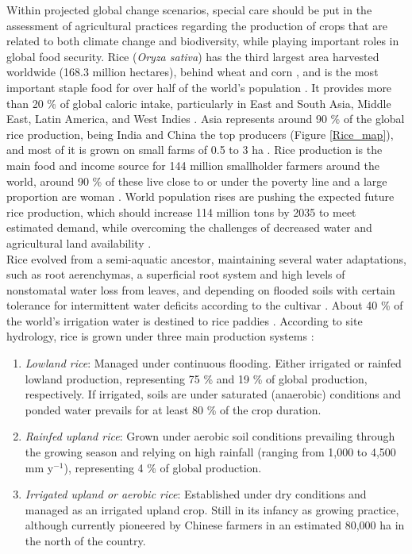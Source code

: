 Within projected global change scenarios, special care should be put in the assessment of agricultural practices regarding the production of crops that are related to both climate change and biodiversity, while playing important roles in global food security. Rice (\textit{Oryza sativa}) has the third largest area harvested worldwide (168.3 million hectares), behind wheat and corn \citep{fao2023a}, and is the most important staple food for over half of the world's population \citep{seck2012crops}. It provides more than 20 \% of global caloric intake, particularly in East and South Asia, Middle East, Latin America, and West Indies \citep{sharif2014rice}. Asia represents around 90 \% of the global rice production, being India and China the top producers (Figure \ref{Rice_map}), and most of it is grown on small farms of 0.5 to 3 ha \citep{rao2017}. Rice production is the main food and income source for 144 million smallholder farmers around the world, around 90 \% of these live close to or under the poverty line and a large proportion are woman \citep{srv2020}. World population rises are pushing the expected future rice production, which should increase 114 million tons by 2035 to meet estimated demand, while overcoming the challenges of decreased water and agricultural land availability \citep{redfern2012rice}.\\ %

Rice evolved from a semi-aquatic ancestor, maintaining several water adaptations, such as root aerenchymas, a superficial root system and high levels of nonstomatal water loss from leaves, and depending on flooded soils with certain tolerance for intermittent water deficits according to the cultivar \citep{lafitte2002requirements}. About 40 \% of the world's irrigation water is destined to rice paddies \citep{rao2017}. According to site hydrology, rice is grown under three main production systems \citep{bouman2007a, grisp2013}:

\begin{enumerate}
\item \textit{Lowland rice}: Managed under continuous flooding. Either irrigated  or rainfed lowland production, representing 75 \% and 19 \% of global production, respectively. If irrigated, soils are under saturated (anaerobic) conditions and ponded water prevails for at least 80 \% of the crop duration.
\item \textit{Rainfed upland rice}: Grown under aerobic soil conditions prevailing through the growing season and relying on high rainfall (ranging from 1,000 to 4,500 mm y$^{-1}$), representing 4 \% of global production.
\item \textit{Irrigated upland or aerobic rice}: Established under dry conditions and managed as an irrigated upland crop. Still in its infancy as growing practice, although currently pioneered by Chinese farmers in an estimated 80,000 ha in the north of the country. 
\end{enumerate}


